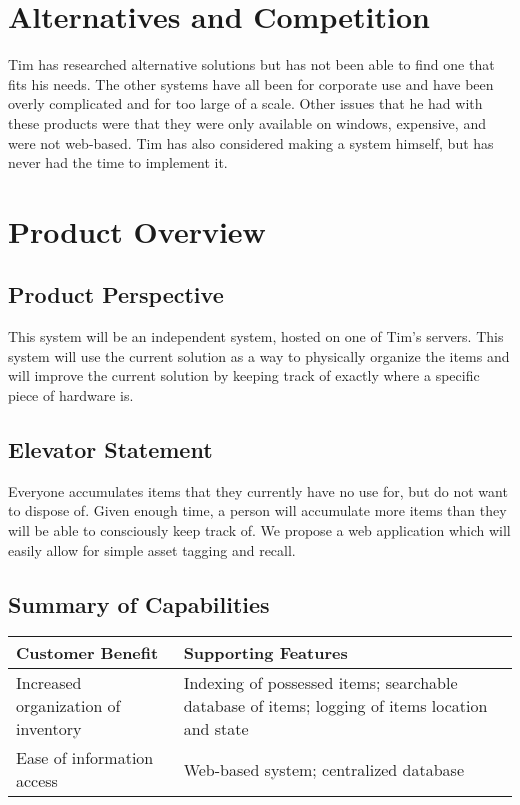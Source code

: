 \documentclass{article}
\begin{document}
\section{Alternatives and Competition}
Tim has researched alternative solutions but has not been able to find one that fits his needs.  The other systems have all been for corporate use and have been overly complicated and for too large of a scale.  Other issues that he had with these products were that they were only available on windows, expensive, and were not web-based.  Tim has also considered making a system himself, but has never had the time to implement it.

\section{Product Overview}

\subsection{Product Perspective}
This system will be an independent system, hosted on one of Tim’s servers.  This system will use the current solution as a way to physically organize the items and will improve the current solution by keeping track of exactly where a specific piece of hardware is.

\subsection{Elevator Statement}
Everyone accumulates items that they currently have no use for, but do not want to dispose of.  Given enough time, a person will accumulate more items than they will be able to consciously keep track of. We propose a web application which will easily allow for simple asset tagging and recall.

\subsection{Summary of Capabilities}
\begin{tabular}{ | p{2.5in} | p{3.5in} | }
\hline
Customer Benefit & Supporting Features\\
\hline
Increased organization of inventory & Indexing of possessed items; searchable database of items; logging of items location and state\\
\hline
Ease of information access & Web-based system; centralized database\\
\hline
\end{tabular}
\end{document}
